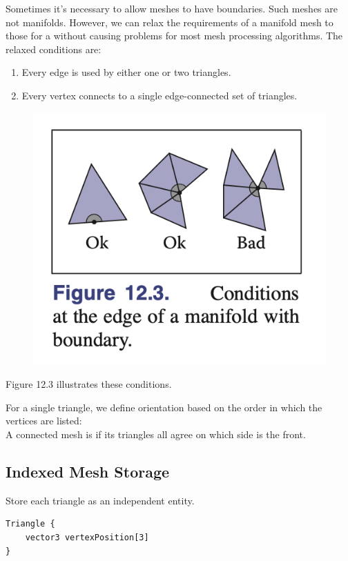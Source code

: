 \documentclass[11pt]{article}
\numberwithin{equation}{section}
\begin{document}
Sometimes it's necessary to allow meshes to have boundaries. Such meshes are not manifolds. However, we can relax the requirements of a manifold mesh to those for a  without causing problems for most mesh processing algorithms. The relaxed conditions are:
\begin{enumerate}
	\item Every edge is used by either one or two triangles.
	\item Every vertex connects to a single edge-connected set of triangles.
\end{enumerate}

\begin{figure}[H]
	\centering
	\includegraphics[scale=0.6]{p17}
\end{figure}
\noindent Figure 12.3 illustrates these conditions. 

\property[orientation]
For a single triangle, we define orientation based on the order in which the vertices are listed: \\
A connected mesh is  if its triangles all agree on which side is the front.


\subsection{Indexed Mesh Storage}
Store each triangle as an independent entity.
\begin{framed}
\begin{verbatim}
Triangle {
	vector3 vertexPosition[3]
}
\end{verbatim}
\end{framed}
\end{document}
